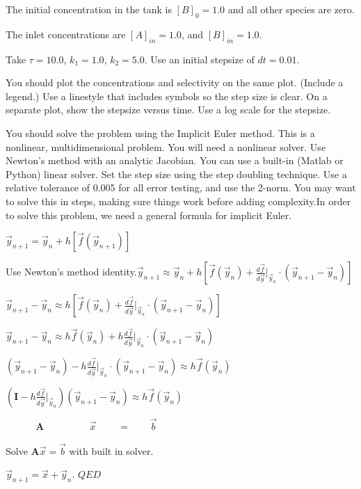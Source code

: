 \documentclass[letterpaper,10pt,english]{/usr/share/sphinx/texinputs/sphinxhowto}
\begin{document}
The initial concentration in the tank is $[B]_0 = 1.0$ and all other
species are zero.

The inlet concentrations are $[A]_{in} = 1.0$, and $[B]_{in} = 1.0$.

Take $\tau=10.0$, $k_1=1.0$, $k_2=5.0$. Use an initial stepsize of
$dt=0.01$.

You should plot the concentrations and selectivity on the same plot.
(Include a legend.) Use a linestyle that includes symbols so the step
size is clear. On a separate plot, show the stepsize versus time. Use a
log scale for the stepsize.

You should solve the problem using the Implicit Euler method. This is a
nonlinear, multidimensional problem. You will need a nonlinear solver.
Use Newton's method with an analytic Jacobian. You can use a built-in
(Matlab or Python) linear solver. Set the step size using the step
doubling technique. Use a relative tolerance of 0.005 for all error
testing, and use the 2-norm. You may want to solve this in steps, making
sure things work before adding complexity.In order to solve this problem, we need a general formula for implicit
Euler.

$\vec{y}_{n+1} = \vec{y}_n + h\left[\vec{f}(\vec{y}_{n+1})\right]$

Use Newton's method
identity.$\vec{y}_{n+1} \approx \vec{y}_n + h\left[\vec{f}(\vec{y}_n) + \frac{d\vec{f}}{d\vec{y}}\Big\vert_{\vec{y}_n}\cdot (\vec{y}_{n+1} - \vec{y}_n)\right]$

$\vec{y}_{n+1} - \vec{y}_n\approx h\left[\vec{f}(\vec{y}_n) + \frac{d\vec{f}}{d\vec{y}}\Big\vert_{\vec{y}_n}\cdot (\vec{y}_{n+1} - \vec{y}_n)\right]$

$\vec{y}_{n+1} - \vec{y}_n\approx h\vec{f}(\vec{y}_n) + h\frac{d\vec{f}}{d\vec{y}}\Big\vert_{\vec{y}_n}\cdot (\vec{y}_{n+1} - \vec{y}_n)$

$\left(\vec{y}_{n+1} - \vec{y}_n\right) -h\frac{d\vec{f}}{d\vec{y}}\Big\vert_{\vec{y}_n}\cdot (\vec{y}_{n+1} - \vec{y}_n) \approx h\vec{f}(\vec{y}_n)$

$\left(\mathbf{I} -h\frac{d\vec{f}}{d\vec{y}}\Big\vert_{\vec{y}_n}\right)\left(\vec{y}_{n+1} - \vec{y}_n\right) \approx h\vec{f}(\vec{y}_n)$

$\:\:\:\:\:\:\:\:\:\:\:\:\:\:\mathbf{A}\:\:\:\:\:\:\:\:\:\:\:\:\:\:\:\:\:\:\:\:\:\vec{x} \:\:\:\:\:\:\:\: \:\: =\:\:\:\:\:\:\:\:\:\vec{b}$

Solve $\mathbf{A}\vec{x}=\vec{b}$ with built in solver.

$\vec{y}_{n+1} = \vec{x}+\vec{y}_{n}$. $QED$
\end{document}
